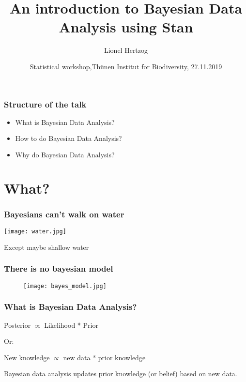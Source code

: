 \documentclass{beamer}
\title{An introduction to Bayesian Data Analysis using Stan}
\subtitle{}
\author{Lionel Hertzog}
\date{Statistical workshop,Th\"{u}nen Institut for Biodiversity, 27.11.2019}
\begin{document}
 
 \frame{\titlepage}
 

\begin{frame}
 \frametitle{\bf Structure of the talk}
  \begin{itemize}
   \item What is Bayesian Data Analysis?
   \item How to do Bayesian Data Analysis?
   \item Why do Bayesian Data Analysis?
  \end{itemize}

 
 \end{frame} 
 
 
\section*{What?} 

 
 \begin{frame}
  \frametitle{\bf Bayesians can't walk on water}

 \texttt{[image: water.jpg]}
 
 Except maybe shallow water
  
 \end{frame}
 
 \begin{frame}
  \frametitle{\bf There is no bayesian model}
  
  \begin{figure}
    \texttt{[image: bayes\_model.jpg]}
  \end{figure}

 
  


  
 \end{frame}
 
  \begin{frame}
  \frametitle{\bf What is Bayesian Data Analysis?}
  
    
  Posterior $\propto$ Likelihood * Prior
  
  \vspace*{1cm}
  
  Or:
  
  \vspace*{1cm}
  
  New knowledge $\propto$ new data * prior knowledge
  
  \vspace*{1cm}
  
  Bayesian data analysis updates prior knowledge (or belief) based on new data.
  
 \end{frame}
 
\end{document}
